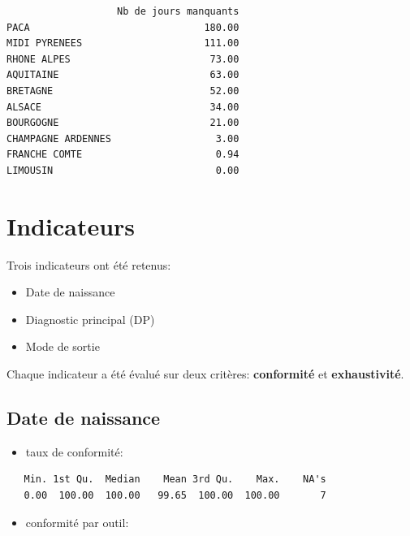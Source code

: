 \documentclass[]{article}
\begin{document}
\begin{verbatim}
                   Nb de jours manquants
PACA                              180.00
MIDI PYRENEES                     111.00
RHONE ALPES                        73.00
AQUITAINE                          63.00
BRETAGNE                           52.00
ALSACE                             34.00
BOURGOGNE                          21.00
CHAMPAGNE ARDENNES                  3.00
FRANCHE COMTE                       0.94
LIMOUSIN                            0.00
\end{verbatim}

\section{Indicateurs}\label{indicateurs}

Trois indicateurs ont été retenus:

\begin{itemize}
\itemsep1pt\parskip0pt
\item
  Date de naissance
\item
  Diagnostic principal (DP)
\item
  Mode de sortie
\end{itemize}

Chaque indicateur a été évalué sur deux critères: \textbf{conformité} et
\textbf{exhaustivité}.

\subsection{Date de naissance}\label{date-de-naissance}

\begin{itemize}
\itemsep1pt\parskip0pt
\item
  taux de conformité:
\end{itemize}

\begin{verbatim}
   Min. 1st Qu.  Median    Mean 3rd Qu.    Max.    NA's 
   0.00  100.00  100.00   99.65  100.00  100.00       7 
\end{verbatim}

\begin{itemize}
\itemsep1pt\parskip0pt
\item
  conformité par outil:
\end{itemize}
\end{document}
